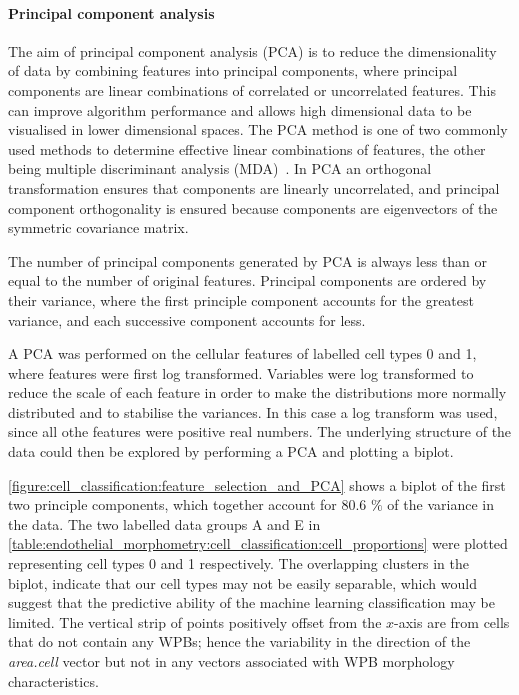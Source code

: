 \paragraph{Principal component analysis}
The aim of principal component analysis (PCA) is to reduce the dimensionality of data by combining features into principal components, where principal components are linear combinations of correlated or uncorrelated features. This can improve algorithm performance and allows high dimensional data to be visualised in lower dimensional spaces. The PCA method is one of two commonly used methods to determine effective linear combinations of features, the other being multiple discriminant analysis (MDA)~\cite{Duda2000}. In PCA an orthogonal transformation ensures that components are linearly uncorrelated, and principal component orthogonality is ensured because components are eigenvectors of the symmetric covariance matrix.

The number of principal components generated by PCA is always less than or equal to the number of original features. Principal components are ordered by their variance, where the first principle component accounts for the greatest variance, and each successive component accounts for less.

A PCA was performed on the cellular features of labelled cell types 0 and 1, where features were first log transformed. Variables were log transformed to reduce the scale of each feature in order to make the distributions more normally distributed and to stabilise the variances. In this case a log transform was used, since all othe features were positive real numbers. The underlying structure of the data could then be explored by performing a PCA and plotting a biplot.

\autoref{figure:cell_classification:feature_selection_and_PCA} shows a biplot of the first two principle components, which together account for 80.6 $\%$ of the variance in the data. The two labelled data groups A and E in \autoref{table:endothelial_morphometry:cell_classification:cell_proportions} were plotted representing cell types 0 and 1 respectively. The overlapping clusters in the biplot, indicate that our cell types may not be easily separable, which would suggest that the predictive ability of the  machine learning classification may be limited. The vertical strip of points positively offset from the $x$-axis are from cells that do not contain any WPBs; hence the variability in the direction of the \emph{area.cell} vector but not in any vectors associated with WPB morphology characteristics.

